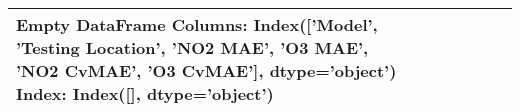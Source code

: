 \begin{tabular}{lllllll}
\toprule
Empty DataFrame
Columns: Index(['Model', 'Testing Location', 'NO2 MAE', 'O3 MAE', 'NO2 CvMAE',
       'O3 CvMAE'],
      dtype='object')
Index: Index([], dtype='object') \\
\bottomrule
\end{tabular}
